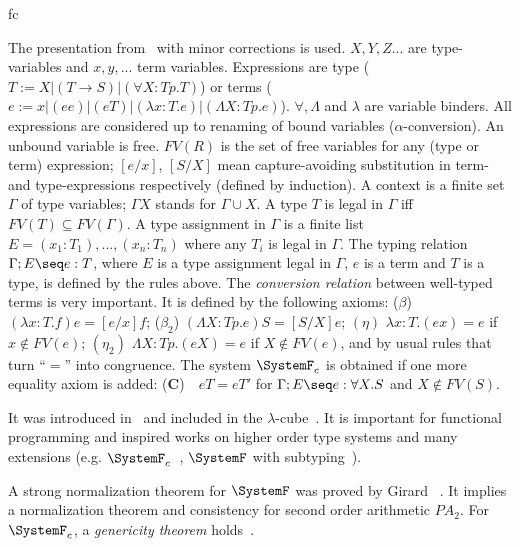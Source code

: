 \begin{entry}{fc}
	\begin{clarifications}
	 The presentation from~\cite{AspLongo:91} with minor corrections is used. $X, Y, Z...$ are type-variables and $x, y, ...$ term variables. Expressions are type ($T:= X | (T\rightarrow S)|(\forall X:Tp.T)$) or terms ($e:= x|(ee)|(eT)|(\lambda x:T.e)|(\Lambda X:Tp.e)$).  
%
$\forall, \Lambda$ and $\lambda$ are variable binders. All expressions are considered up to renaming of bound variables
($\alpha$-conversion). An unbound variable is free. $FV(R)$ is the set of free
variables for any (type or term) expression; $[e/x]$, $[S/X]$ mean capture-avoiding substitution in term- and type-expressions respectively (defined by induction). 
A context is a finite set $\Gamma$ of type variables; $\Gamma X$ stands for $\Gamma\cup{X}$. A type $T$ is legal in $\Gamma$ iff 
$FV(T)\subseteq FV(\Gamma)$. A type assignment in $\Gamma$ is a finite list
$E = (x_1:T_1),..., (x_n:T_n)$ where any $T_i$ is legal in $\Gamma$. 
The typing
relation $\Gamma; E\seq e:T$, where $E$ is a type assignment legal in $\Gamma$,
$e$ is a term and $T$ is a type, is defined by the rules
above.
%
The {\em conversion relation} between well-typed 
terms is very important. It is defined
by the following axioms: ($\beta$) $(\lambda x:T.f)e = [e/x]f$; 
($\beta_2$) $(\Lambda X:Tp.e)S=[S/X]e$; $(\eta)$ $\lambda x:T.(ex)=e$ if 
$x\notin FV(e)$; $(\eta_2)$ $\Lambda X:Tp.(eX) = e$ if 
$X\notin FV(e)$, and by usual rules that turn ``$=$'' into congruence.
The system $\SystemF_c$ is obtained if one more equality axiom is added:
({\bf C})\,\,\,\, $eT = eT'$ for $\Gamma; E\seq e:\forall X.S$ and $X\notin FV(S)$.
	\end{clarifications}
	
	\begin{history}
It was introduced in~\cite{Gir:71,Rey:74} and included in the $\lambda$-cube~\cite{Bar:91}. It is important for functional programming and inspired works on higher order type systems and many extensions (e.g. $\SystemF_c$~\cite{LMS:93}, $\SystemF$ with subtyping~\cite{CMMS:91, LMS:00}).
	\end{history}
	
	\begin{technicalities}
A strong normalization theorem for $\SystemF$ was proved by Girard
~\cite{Gir:72}. It implies a normalization theorem and consistency for second
order arithmetic $PA_2$. For $\SystemF_c$, a {\em genericity theorem} holds~\cite{LMS:93}.
	\end{technicalities}
	
\vspace{-10pt}
	
	
	
	
	\end{entry}
